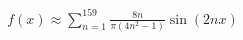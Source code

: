 \documentclass[preview]{standalone}
\begin{document}
\begin{align*}
f(x) \approx \sum_{n=1}^{159} \frac{8n}{\pi(4n^2-1)} \sin(2nx)
\end{align*}
\end{document}
